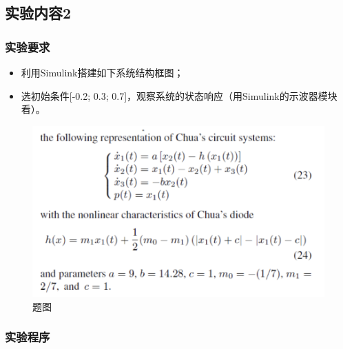 \documentclass[UTF8]{article}
\begin{document}
\subsection{实验内容2}
\subsubsection{实验要求}

\begin{itemize}
    \item 利用Simulink搭建如下系统结构框图；
    \item 选初始条件[-0.2; 0.3; 0.7]，观察系统的状态响应（用Simulink的示波器模块看）。
\end{itemize}

\begin{figure}[H]
    \centering %
    \includegraphics[width=.8\textwidth]{figure/exp1_2.png} 
    \caption{题图} %
\end{figure}


\subsubsection{实验程序}
\end{document}
